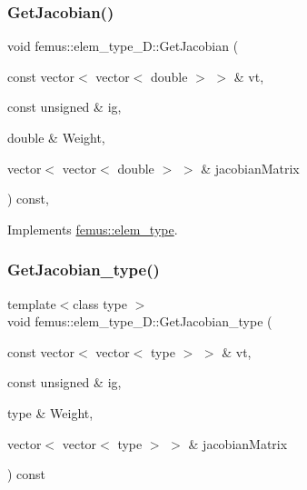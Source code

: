 \subsubsection{\texorpdfstring{Get\+Jacobian()}{GetJacobian()}\hspace{0.1cm}{\footnotesize\ttfamily [2/2]}}
{\footnotesize\ttfamily void femus\+::elem\+\_\+type\+\_\+D\+::\+Get\+Jacobian (\begin{DoxyParamCaption}\item[{const vector$<$ vector$<$ double $>$ $>$ \&}]{vt,  }\item[{const unsigned \&}]{ig,  }\item[{double \&}]{Weight,  }\item[{vector$<$ vector$<$ double $>$ $>$ \&}]{jacobian\+Matrix }\end{DoxyParamCaption}) const\hspace{0.3cm}{\ttfamily [inline]}, {\ttfamily [virtual]}}



Implements \mbox{\hyperlink{classfemus_1_1elem__type_a6c883b7946e55db8783fd0177546610a}{femus\+::elem\+\_\+type}}.

\mbox{\label{classfemus_1_1elem__type__2_d_a9d1cc104a524ee4ccc32a9bae6b0cef6}} 
\subsubsection{\texorpdfstring{Get\+Jacobian\+\_\+type()}{GetJacobian\_type()}}
{\footnotesize\ttfamily template$<$class type $>$ \\
void femus\+::elem\+\_\+type\+\_\+D\+::\+Get\+Jacobian\+\_\+type (\begin{DoxyParamCaption}\item[{const vector$<$ vector$<$ type $>$ $>$ \&}]{vt,  }\item[{const unsigned \&}]{ig,  }\item[{type \&}]{Weight,  }\item[{vector$<$ vector$<$ type $>$ $>$ \&}]{jacobian\+Matrix }\end{DoxyParamCaption}) const}

\mbox{\label{classfemus_1_1elem__type__2_d_a9e2ed95e14dbbf28d6399c50ba83ebe9}} 
